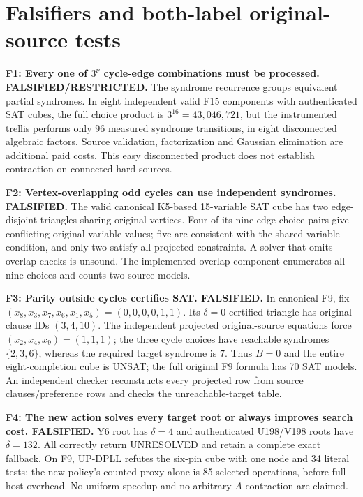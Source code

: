 \documentclass[11pt]{article}
\begin{document}
\section{Falsifiers and both-label original-source tests}
\noindent\textbf{F1: Every one of $3^\nu$ cycle-edge combinations must be processed. FALSIFIED/RESTRICTED.} The syndrome recurrence groups equivalent partial syndromes. In eight independent valid F15 components with authenticated SAT cubes, the full choice product is $3^{16}=43{,}046{,}721$, but the instrumented trellis performs only 96 measured syndrome transitions, in eight disconnected algebraic factors. Source validation, factorization and Gaussian elimination are additional paid costs. This easy disconnected product does not establish contraction on connected hard sources.

\noindent\textbf{F2: Vertex-overlapping odd cycles can use independent syndromes. FALSIFIED.} The valid canonical K5-based 15-variable SAT cube has two edge-disjoint triangles sharing original vertices. Four of its nine edge-choice pairs give conflicting original-variable values; five are consistent with the shared-variable condition, and only two satisfy all projected constraints. A solver that omits overlap checks is unsound. The implemented overlap component enumerates all nine choices and counts two source models.

\noindent\textbf{F3: Parity outside cycles certifies SAT. FALSIFIED.} In canonical F9, fix $(x_8,x_3,x_7,x_6,x_1,x_5)=(0,0,0,0,1,1)$. Its $\delta=0$ certified triangle has original clause IDs $(3,4,10)$. The independent projected original-source equations force $(x_2,x_4,x_9)=(1,1,1)$; the three cycle choices have reachable syndromes $\{2,3,6\}$, whereas the required target syndrome is $7$. Thus $B=0$ and the entire eight-completion cube is UNSAT; the full original F9 formula has 70 SAT models. An independent checker reconstructs every projected row from source clauses/preference rows and checks the unreachable-target table.

\noindent\textbf{F4: The new action solves every target root or always improves search cost. FALSIFIED.} Y6 root has $\delta=4$ and authenticated U198/V198 roots have $\delta=132$. All correctly return UNRESOLVED and retain a complete exact fallback. On F9, UP-DPLL refutes the six-pin cube with one node and 34 literal tests; the new policy's counted proxy alone is 85 selected operations, before full host overhead. No uniform speedup and no arbitrary-$A$ contraction are claimed.
\end{document}

